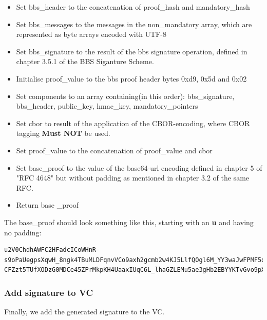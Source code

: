 \documentclass[
	a4paper               %
	,bibliography=totoc   %
	,listof=totoc         %
	,monolingual
	twoside=false,
]{bfhthesis}              %
\begin{document}
\begin{itemize}
	\item Set bbs\_header to the concatenation of proof\_hash and mandatory\_hash
	\item Set bbs\_messages to the messages in the non\_mandatory array, which are represented as byte arrays encoded with UTF-8
	\item Set bbs\_signature to the result of the bbs signature operation, defined in chapter 3.5.1 of the BBS Siganture Scheme\cite{bbs-signature-scheme}.
	\item Initialise proof\_value to the bbs proof header bytes 0xd9, 0x5d and 0x02
	\item Set components to an array containing(in this order): bbs\_signature, bbs\_header, public\_key, hmac\_key, mandatory\_pointers
	\item Set cbor to result of the application of the CBOR-encoding\cite{cbor}, where CBOR tagging \textbf{Must NOT} be used.
	\item Set proof\_value to the concatenation of proof\_value and cbor
	\item Set base\_proof to the value of the base64-url encoding defined in chapter 5 of "RFC 4648"\cite{base64} but without padding as mentioned in chapter 3.2 of the same RFC.
	\item Return base \_proof
\end{itemize}

The base\_proof should look something like this, starting with an \textbf{u} and having no padding:

\begin{lstlisting}[language=canon,firstnumber=1,caption={Serialised signature},captionpos=b]
u2V0ChdhAWFC2HFadcICoWHnR-s9oPaUegpsXqwH_8ngk4TBuMLDFqnvVCo9axh2gcmb2w4KJ5LlfQOgl6M_YY3waJwFPMF5oqtZGI0rzf6HfWOS6VfGPWthAWEClRFA4ut1V3aj4gUvaZAvy2PvZHn-CFZzt5TUfXODzG0MDCe45ZPrMkpKH4UaaxIUqC6L_lhaGZLEMu5ae3gHb2EBYYKTvGvo9pXVJbxIrm3i4wkdhUxqKCTIGrnxFuAdZwWi6T3omD5wzZ7bAGbRneEEQSxBmXtvnC6Pr59nPv_v3HrAW9wq_uxYzF_NyaX3GPv0h_FV2T2OSao8C6uoyWiqIj9hAWCAAESIzRFVmd4iZqrvM3e7_ABEiM0RVZneImaq7zN3u_4F4HS9jcmVkZW50aWFsU3ViamVjdC9maXJzdF9uYW1l
\end{lstlisting}

\subsubsection{Add signature to VC}

Finally, we add the generated signature to the VC.
\end{document}
